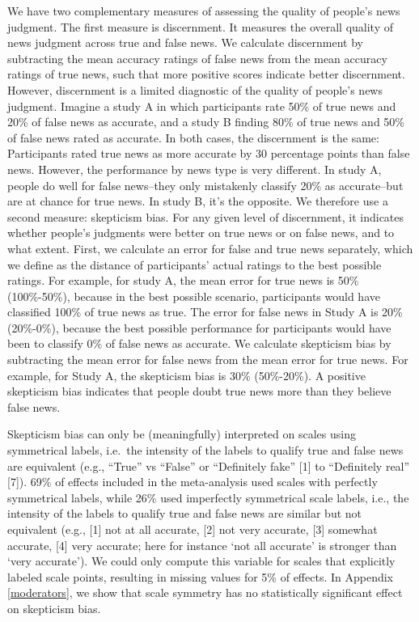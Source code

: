 \documentclass[
  doc,floatsintext]{apa6}
\begin{document}
We have two complementary measures of assessing the quality of people's news judgment. The first measure is discernment. It measures the overall quality of news judgment across true and false news. We calculate discernment by subtracting the mean accuracy ratings of false news from the mean accuracy ratings of true news, such that more positive scores indicate better discernment. However, discernment is a limited diagnostic of the quality of people's news judgment. Imagine a study A in which participants rate 50\% of true news and 20\% of false news as accurate, and a study B finding 80\% of true news and 50\% of false news rated as accurate. In both cases, the discernment is the same: Participants rated true news as more accurate by 30 percentage points than false news. However, the performance by news type is very different. In study A, people do well for false news--they only mistakenly classify 20\% as accurate--but are at chance for true news. In study B, it's the opposite. We therefore use a second measure: skepticism bias. For any given level of discernment, it indicates whether people's judgments were better on true news or on false news, and to what extent. First, we calculate an error for false and true news separately, which we define as the distance of participants' actual ratings to the best possible ratings. For example, for study A, the mean error for true news is 50\% (100\%-50\%), because in the best possible scenario, participants would have classified 100\% of true news as true. The error for false news in Study A is 20\% (20\%-0\%), because the best possible performance for participants would have been to classify 0\% of false news as accurate. We calculate skepticism bias by subtracting the mean error for false news from the mean error for true news. For example, for Study A, the skepticism bias is 30\% (50\%-20\%). A positive skepticism bias indicates that people doubt true news more than they believe false news.

Skepticism bias can only be (meaningfully) interpreted on scales using symmetrical labels, i.e.~the intensity of the labels to qualify true and false news are equivalent (e.g., ``True'' vs ``False'' or ``Definitely fake'' {[}1{]} to ``Definitely real'' {[}7{]}). 69\% of effects included in the meta-analysis used scales with perfectly symmetrical labels, while 26\% used imperfectly symmetrical scale labels, i.e., the intensity of the labels to qualify true and false news are similar but not equivalent (e.g., {[}1{]} not at all accurate, {[}2{]} not very accurate, {[}3{]} somewhat accurate, {[}4{]} very accurate; here for instance `not all accurate' is stronger than `very accurate'). We could only compute this variable for scales that explicitly labeled scale points, resulting in missing values for 5\% of effects. In Appendix \ref{moderators}, we show that scale symmetry has no statistically significant effect on skepticism bias.
\end{document}
